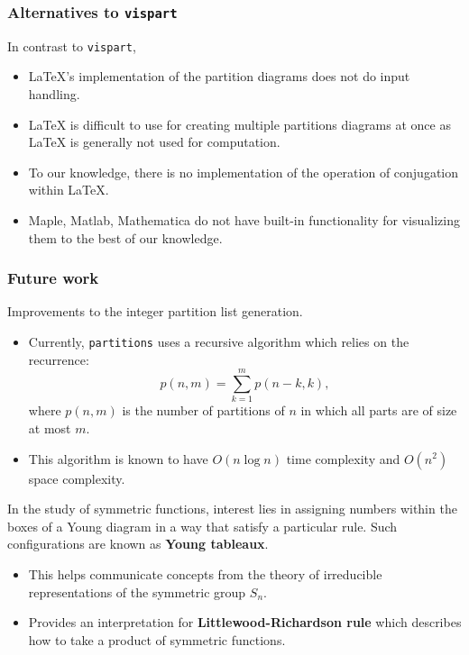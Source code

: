 \documentclass{beamer}
\begin{document}
\begin{frame}
\frametitle{Alternatives to \texttt{vispart}}

In contrast to \texttt{vispart},
\begin{itemize}
	\item LaTeX's implementation of the partition diagrams does not do input handling.
	\item LaTeX is difficult to use for creating multiple partitions diagrams at once as LaTeX is generally not used for computation.
	\item To our knowledge, there is no implementation of the operation of conjugation within LaTeX.
	\item Maple, Matlab, Mathematica do not have built-in functionality for visualizing them to the best of our knowledge.
\end{itemize}
\end{frame}


\begin{frame}
\frametitle{Future work}	

Improvements to the integer partition list generation.
\begin{itemize}
	\item Currently, \texttt{partitions} uses a recursive algorithm which relies on the recurrence:
	$$p(n,m) = \sum_{k=1}^{m}p(n-k, k),$$
	where $p(n,m)$ is the number of partitions of $n$ in which all parts are of size at most $m$.
	\item This algorithm is known to have $O(n\log n)$ time complexity and $O(n^2)$ space complexity.
\end{itemize}
\end{frame}

\begin{frame}
	In the study of symmetric functions, interest lies in assigning numbers within the boxes of a Young diagram in a way that satisfy a particular rule. Such configurations are known as \textbf{Young tableaux}.
\begin{itemize}
\frametitle{Future work - math}
\item This helps communicate concepts from the theory of irreducible representations of the symmetric group $S_n$.
\item Provides an interpretation for \textbf{Littlewood-Richardson rule} which describes how to take a product of symmetric functions.
\end{itemize}
\end{frame}
\end{document}
